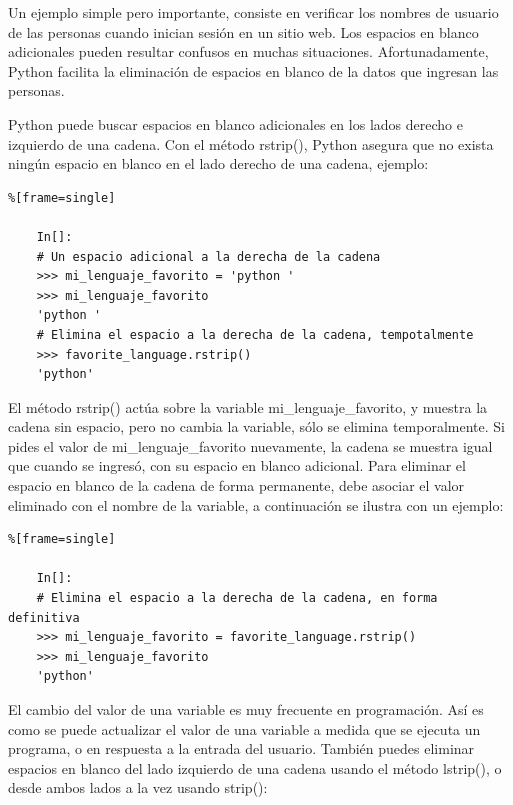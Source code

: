 
Un ejemplo simple pero importante, consiste en verificar los nombres de usuario de las personas cuando
inician sesión en un sitio web. Los espacios en blanco adicionales pueden resultar confusos en 
muchas  situaciones. Afortunadamente, Python facilita la eliminación de espacios en blanco 
de la datos que ingresan las personas.  


Python puede buscar espacios en blanco adicionales en los lados derecho e izquierdo de una cadena. 
Con el método  {\ttfamily  rstrip()}, Python asegura que no exista ningún espacio en blanco en el lado 
derecho de una cadena, ejemplo:      %

\begin{lstlisting}%[frame=single]
	
	In[]:
	# Un espacio adicional a la derecha de la cadena 
	>>> mi_lenguaje_favorito = 'python '
	>>> mi_lenguaje_favorito
	'python '
	# Elimina el espacio a la derecha de la cadena, tempotalmente
	>>> favorite_language.rstrip()
	'python'
\end{lstlisting}

El método {\ttfamily rstrip()} actúa sobre la variable {\ttfamily mi\_lenguaje\_favorito}, y  muestra la cadena sin espacio, pero no cambia la variable, sólo se elimina temporalmente. Si pides el valor  de {\ttfamily mi\_lenguaje\_favorito} nuevamente,
la cadena se muestra igual que cuando se ingresó,  con su espacio en blanco adicional. Para eliminar el espacio
en blanco de la cadena de forma permanente, debe  asociar el valor eliminado con el nombre de la variable,
a continuación se ilustra con un ejemplo:

\begin{lstlisting}%[frame=single]
	
	In[]:
	# Elimina el espacio a la derecha de la cadena, en forma definitiva
	>>> mi_lenguaje_favorito = favorite_language.rstrip()
	>>> mi_lenguaje_favorito
	'python'
\end{lstlisting}



El cambio del valor de una variable es muy frecuente  en programación. Así es como se puede 
actualizar el valor de una variable a medida que se ejecuta un programa, o en respuesta a la entrada del usuario. También puedes eliminar espacios en blanco del lado izquierdo de una cadena usando el  método {\ttfamily lstrip()}, o desde ambos lados a la vez usando {\ttfamily strip()}:  



